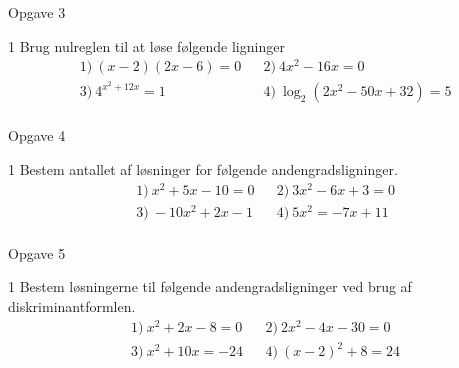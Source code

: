 \begin{opgavetekst}{Opgave 3}
\end{opgavetekst}
\begin{delopgave}{}{1}
	Brug nulreglen til at løse følgende ligninger
	\begin{align*}
		&1) \ (x-2)(2x-6) = 0  & &2) \ 4x^2 - 16x = 0  \\
		&3) \ 4^{x^2+12x} = 1  & &4) \ \log_2(2x^2 - 50x + 32) = 5  \\
	\end{align*}
\end{delopgave}
\begin{opgavetekst}{Opgave 4}
\end{opgavetekst}
\begin{delopgave}{}{1}
	Bestem antallet af løsninger for følgende andengradsligninger. 
	\begin{align*}
		&1) \ x^2 + 5x - 10 = 0 & &2) \ 3x^2 - 6x + 3 = 0 \\
		&3) \ -10x^2 +2x - 1 & &4) \ 5x^2 = -7x + 11 \\
	\end{align*}
\end{delopgave}
\begin{opgavetekst}{Opgave 5}
\end{opgavetekst}
\begin{delopgave}{}{1}
	Bestem løsningerne til følgende andengradsligninger ved brug af diskriminantformlen.
	\begin{align*}
		&1) \ x^2 + 2x - 8 = 0 & &2) \ 2x^2-4x-30 = 0 \\
		&3) \ x^2 + 10x  = -24 & &4) \ (x-2)^2+ 8 = 24 \\
	\end{align*}
\end{delopgave}
